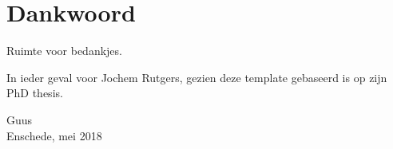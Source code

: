 \chapter*{Dankwoord}

Ruimte voor bedankjes.

In ieder geval voor Jochem Rutgers, gezien deze template gebaseerd is op zijn PhD thesis\cite{rutgers2014:thesis}.

Guus\\
Enschede, mei 2018

